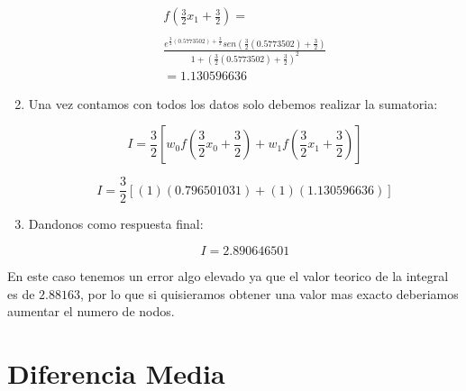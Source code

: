 \documentclass[journal,transmag]{IEEEtran}
\theoremstyle{mytheoremstyle}
\theoremstyle{mytheoremstyle}
\theoremstyle{myproblemstyle}
\begin{document}
\begin{enumerate}
                            \begin{multline*}
                        f(\frac{3}{2}x_1+\frac{3}{2})=\\
                        \\
                        \frac{e^{\frac{3}{2}(0.5773502)+\frac{3}{2}}sen(\frac{3}{2}(0.5773502)+\frac{3}{2})}{1+(\frac{3}{2}(0.5773502)+\frac{3}{2})^2}\\
                        =1.130596636
                    \end{multline*}
                    
                    \item Una vez contamos con todos los datos solo debemos realizar la sumatoria:
                    
                    \begin{equation*}
                        I=\frac{3}{2}[w_0f(\frac{3}{2}x_0+\frac{3}{2})+w_1f(\frac{3}{2}x_1+\frac{3}{2})]
                    \end{equation*}
                    
                    \begin{equation*}
                        I=\frac{3}{2}[(1)(0.796501031)+(1)(1.130596636)]
                    \end{equation*}
                    
                    \item Dandonos como respuesta final:
                    
                            
                    \begin{equation*}
                        I=2.890646501
                    \end{equation*}
                    
                \end{enumerate}
                
                En este caso tenemos un error algo elevado ya que el valor teorico de la integral es de $2.88163$, por lo que si quisieramos obtener una valor mas exacto deberiamos aumentar el numero de nodos.
            
\section{Diferencia Media}
\end{document}

